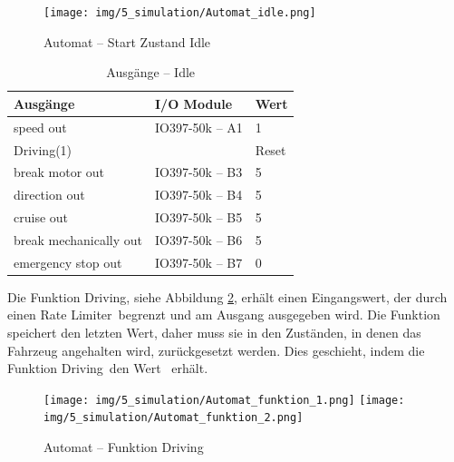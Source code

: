 \pagebreak[1]
\begin{figure}[!ht]
	\begin{center}
		\texttt{[image: img/5\_simulation/Automat\_idle.png]}
		\caption{Automat – Start Zustand \frqq Idle\flqq}
		\label{Automat_man:img:start_idle}
	\end{center}
\end{figure}
\pagebreak[4]


\pagebreak[1]
\begin{table}[!ht]
	\centering
	\caption{Ausgänge – Idle}
	\label{Automat_man:tab:z_idle}
	\begin{tabular}{lll}
		\hline
		\textbf{Ausgänge}                           & \textbf{I/O Module}                 & \textbf{Wert} \\ \hline
		\multicolumn{1}{l|}{speed out}              & \multicolumn{1}{l|}{IO397-50k – A1} & 1             \\
		\multicolumn{1}{l|}{Driving(1)}             & \multicolumn{1}{l|}{}               & Reset         \\
		\multicolumn{1}{l|}{break motor out}        & \multicolumn{1}{l|}{IO397-50k – B3} & 5             \\
		\multicolumn{1}{l|}{direction out}          & \multicolumn{1}{l|}{IO397-50k – B4} & 5             \\
		\multicolumn{1}{l|}{cruise out}             & \multicolumn{1}{l|}{IO397-50k – B5} & 5             \\
		\multicolumn{1}{l|}{break mechanically out} & \multicolumn{1}{l|}{IO397-50k – B6} & 5             \\
		\multicolumn{1}{l|}{emergency stop out}     & \multicolumn{1}{l|}{IO397-50k – B7} & 0             \\ \hline
	\end{tabular}
\end{table}
\pagebreak[1]

Die Funktion \frqq Driving\flqq, siehe Abbildung \ref{Automat:img:fnc_Driving}, erhält einen Eingangswert, der durch einen \frqq Rate Limiter\flqq\ begrenzt und am Ausgang ausgegeben wird. Die Funktion speichert den letzten Wert, daher muss sie in den Zuständen, in denen das Fahrzeug angehalten wird, zurückgesetzt werden. Dies geschieht, indem die Funktion \frqq Driving\flqq\ den Wert \flqq\ erhält.\\

\pagebreak[1]
\begin{figure}[!ht]
	\begin{center}
		\texttt{[image: img/5\_simulation/Automat\_funktion\_1.png]}
		\texttt{[image: img/5\_simulation/Automat\_funktion\_2.png]}
		\caption{Automat – Funktion Driving}
		\label{Automat:img:fnc_Driving}
	\end{center}
\end{figure}
\pagebreak[4]

